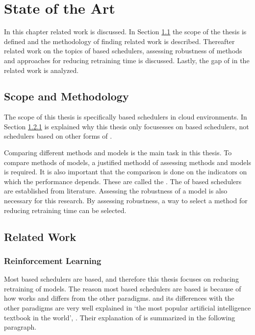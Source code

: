 \chapter{State of the Art}\label{sec:state-of-the-art}

In this chapter related work is discussed. In Section \ref{sec:scope} the
scope of the thesis is defined and the methodology of finding related work is
described. Thereafter related work on the topics of \rl based schedulers,
assessing robustness of \rl methods and approaches for reducing retraining
time is discussed. Lastly, the gap of in the related work is analyzed.


\section{Scope and Methodology}\label{sec:scope}

The scope of this thesis is specifically \rl based schedulers in cloud
environments. In Section \ref{sec:rl} is explained why this thesis only
focusesses on \rl based schedulers, not schedulers based on other forms of
\ml.

Comparing different methods and models is the main task in this thesis. To
compare methods of models, a justified methodd of assessing methods and models
is required. It is also important that the comparison is done on the
indicators on which the performance depends. These are called the \kpis. The
\kpis of \rl based schedulers are established from literature. Assessing the
robustness of a model is also necessary for this research. By assessing
robustness, a way to select a method for reducing retraining time can be
selected.


\section{Related Work}

\subsection{Reinforcement Learning}\label{sec:rl}

Most \ml based schedulers are \rl based, and therefore this thesis focuses on
reducing retraining of \rl models. The reason most \ml based schedulers are
\rl based is because of how \rl works and differs from the other \ml
paradigms. \rl and its differences with the other paradigms are very well
explained in `the most popular artificial intelligence textbook in the
world'\footnotemark, . Their explanation of \rl is
summarized in the following paragraph.

